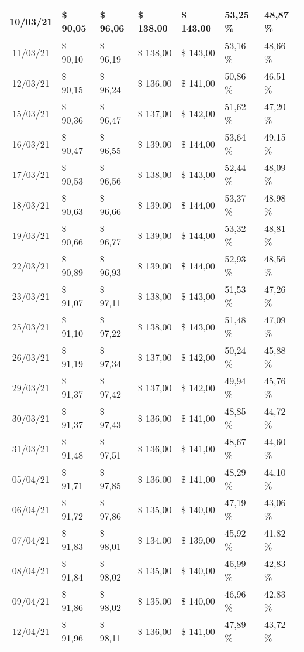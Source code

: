 \begin{center}
\begin{longtable}{|c|p{1.5cm}|p{1.5cm}|p{1.5cm}|p{1.5cm}|p{1.5cm}|p{1.5cm}|}
10/03/21 & \$ 90,05 & \$ 96,06 & \$ 138,00 & \$ 143,00 & 53,25 \% & 48,87 \% \\ \hline
11/03/21 & \$ 90,10 & \$ 96,19 & \$ 138,00 & \$ 143,00 & 53,16 \% & 48,66 \% \\ \hline
12/03/21 & \$ 90,15 & \$ 96,24 & \$ 136,00 & \$ 141,00 & 50,86 \% & 46,51 \% \\ \hline
15/03/21 & \$ 90,36 & \$ 96,47 & \$ 137,00 & \$ 142,00 & 51,62 \% & 47,20 \% \\ \hline
16/03/21 & \$ 90,47 & \$ 96,55 & \$ 139,00 & \$ 144,00 & 53,64 \% & 49,15 \% \\ \hline
17/03/21 & \$ 90,53 & \$ 96,56 & \$ 138,00 & \$ 143,00 & 52,44 \% & 48,09 \% \\ \hline
18/03/21 & \$ 90,63 & \$ 96,66 & \$ 139,00 & \$ 144,00 & 53,37 \% & 48,98 \% \\ \hline
19/03/21 & \$ 90,66 & \$ 96,77 & \$ 139,00 & \$ 144,00 & 53,32 \% & 48,81 \% \\ \hline
22/03/21 & \$ 90,89 & \$ 96,93 & \$ 139,00 & \$ 144,00 & 52,93 \% & 48,56 \% \\ \hline
23/03/21 & \$ 91,07 & \$ 97,11 & \$ 138,00 & \$ 143,00 & 51,53 \% & 47,26 \% \\ \hline
25/03/21 & \$ 91,10 & \$ 97,22 & \$ 138,00 & \$ 143,00 & 51,48 \% & 47,09 \% \\ \hline
26/03/21 & \$ 91,19 & \$ 97,34 & \$ 137,00 & \$ 142,00 & 50,24 \% & 45,88 \% \\ \hline
29/03/21 & \$ 91,37 & \$ 97,42 & \$ 137,00 & \$ 142,00 & 49,94 \% & 45,76 \% \\ \hline
30/03/21 & \$ 91,37 & \$ 97,43 & \$ 136,00 & \$ 141,00 & 48,85 \% & 44,72 \% \\ \hline
31/03/21 & \$ 91,48 & \$ 97,51 & \$ 136,00 & \$ 141,00 & 48,67 \% & 44,60 \% \\ \hline
05/04/21 & \$ 91,71 & \$ 97,85 & \$ 136,00 & \$ 141,00 & 48,29 \% & 44,10 \% \\ \hline
06/04/21 & \$ 91,72 & \$ 97,86 & \$ 135,00 & \$ 140,00 & 47,19 \% & 43,06 \% \\ \hline
07/04/21 & \$ 91,83 & \$ 98,01 & \$ 134,00 & \$ 139,00 & 45,92 \% & 41,82 \% \\ \hline
08/04/21 & \$ 91,84 & \$ 98,02 & \$ 135,00 & \$ 140,00 & 46,99 \% & 42,83 \% \\ \hline
09/04/21 & \$ 91,86 & \$ 98,02 & \$ 135,00 & \$ 140,00 & 46,96 \% & 42,83 \% \\ \hline
12/04/21 & \$ 91,96 & \$ 98,11 & \$ 136,00 & \$ 141,00 & 47,89 \% & 43,72 \% \\ \hline

\end{longtable}
\end{center}
